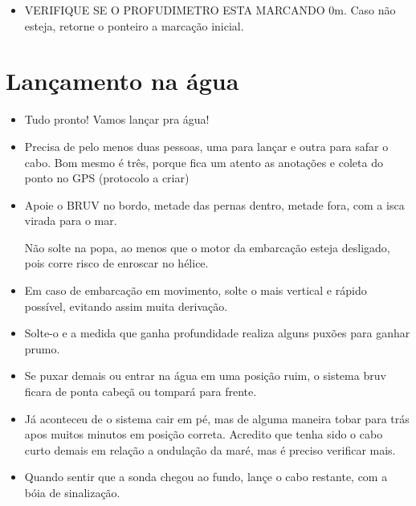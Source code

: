 \documentclass[
  12pt,
  letterpaper,
  DIV=11,
  numbers=noendperiod]{scrreprt}
\begin{document}
\begin{itemize}
\begin{tcolorbox}
  Quando for conectar a haste da isca, tenha cuidado com a bóia de meia
  água do BRUV. Está deve passar por fora da haste. Lembre-se de
  levantá-la antes de fixar a haste.

  \end{tcolorbox}
\item
  VERIFIQUE SE O PROFUDIMETRO ESTA MARCANDO 0m. Caso não esteja, retorne
  o ponteiro a marcação inicial.
\end{itemize}

\section{Lançamento na água}\label{lanuxe7amento-na-uxe1gua}

\begin{itemize}
\item
  Tudo pronto! Vamos lançar pra água!
\item
  Precisa de pelo menos duas pessoas, uma para lançar e outra para safar
  o cabo. Bom mesmo é três, porque fica um atento as anotações e coleta
  do ponto no GPS (protocolo a criar)
\item
  Apoie o BRUV no bordo, metade das pernas dentro, metade fora, com a
  isca virada para o mar.

  \begin{tcolorbox}[enhanced jigsaw, breakable, rightrule=.15mm, colback=white, bottomrule=.15mm, opacitybacktitle=0.6, left=2mm, coltitle=black, leftrule=.75mm, toptitle=1mm, toprule=.15mm, bottomtitle=1mm, titlerule=0mm, title=\textcolor{quarto-callout-warning-color}{\faExclamationTriangle}\hspace{0.5em}{Warning}, colframe=quarto-callout-warning-color-frame, arc=.35mm, colbacktitle=quarto-callout-warning-color!10!white, opacityback=0]

  Não solte na popa, ao menos que o motor da embarcação esteja
  desligado, pois corre risco de enroscar no hélice.

  \end{tcolorbox}
\item
  Em caso de embarcação em movimento, solte o mais vertical e rápido
  possível, evitando assim muita derivação.
\item
  Solte-o e a medida que ganha profundidade realiza alguns puxões para
  ganhar prumo.
\item
  Se puxar demais ou entrar na água em uma posição ruim, o sistema bruv
  ficara de ponta cabeçã ou tompará para frente.
\item
  Já aconteceu de o sistema cair em pé, mas de alguma maneira tobar para
  trás apos muitos minutos em posição correta. Acredito que tenha sido o
  cabo curto demais em relação a ondulação da maré, mas é preciso
  verificar mais.
\item
  Quando sentir que a sonda chegou ao fundo, lançe o cabo restante, com
  a bóia de sinalização.


\end{itemize}
\end{document}
